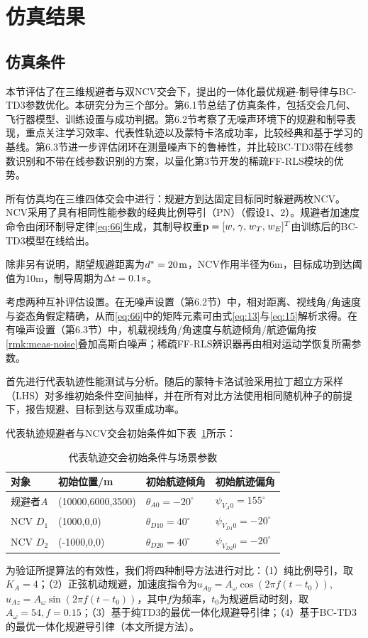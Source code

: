 \section{仿真结果}
\subsection{仿真条件}
本节评估了在三维规避者与双NCV交会下，提出的一体化最优规避-制导律与BC-TD3参数优化。本研究分为三个部分。第6.1节总结了仿真条件，包括交会几何、飞行器模型、训练设置与成功判据。第6.2节考察了无噪声环境下的规避和制导表现，重点关注学习效率、代表性轨迹以及蒙特卡洛成功率，比较经典和基于学习的基线。第6.3节进一步评估闭环在测量噪声下的鲁棒性，并比较BC-TD3带在线参数识别和不带在线参数识别的方案，以量化第3节开发的稀疏FF-RLS模块的优势。

所有仿真均在三维四体交会中进行：规避方到达固定目标同时躲避两枚NCV。NCV采用了具有相同性能参数的经典比例导引（PN）（假设1、2）。规避者加速度命令由闭环制导定律\eqref{eq:66}生成，其制导权重${\mathbf{p}} = {[w,{\kern 1pt} \gamma ,{\kern 1pt} {w_T},{\kern 1pt} {w_E}]^T}$由训练后的BC-TD3模型在线给出。

除非另有说明，期望规避距离为${d^*} = 20{\kern 1pt} {\text{m}}$，NCV作用半径为6m，目标成功到达阈值为10m，制导周期为$\Delta t = 0.1{\kern 1pt} {\text{s}}$。

考虑两种互补评估设置。在无噪声设置（第6.2节）中，相对距离、视线角/角速度与姿态角假定精确，从而\eqref{eq:66}中的矩阵元素可由式\eqref{eq:13}与\eqref{eq:15}解析求得。在有噪声设置（第6.3节）中，机载视线角/角速度与航迹倾角/航迹偏角按\cref{rmk:meas-noise}叠加高斯白噪声；稀疏FF-RLS辨识器再由相对运动学恢复所需参数。

首先进行代表轨迹性能测试与分析。随后的蒙特卡洛试验采用拉丁超立方采样（LHS）对多维初始条件空间抽样，并在所有对比方法使用相同随机种子的前提下，报告规避、目标到达与双重成功率。

代表轨迹规避者与NCV交会初始条件如下表~\ref{tab:init-traj}所示：

\begin{table}[htbp]
\centering
\caption{代表轨迹交会初始条件与场景参数}
\label{tab:init-traj}
\small
\begin{tabularx}{\linewidth}{lXXX}
\toprule
对象 & 初始位置/m & 初始航迹倾角 & 初始航迹偏角 \\
\midrule
规避者$A$ & (10000,6000,3500) & ${\theta _{A0}} =  - {20^ \circ }$ & ${\psi _{{V_A}0}} = {155^ \circ }$ \\
NCV ${D_1}$ & (1000,0,0) & ${\theta _{D10}} = {40^ \circ }$ & ${\psi _{{V_{D1}}0}} =  - {20^ \circ }$ \\
NCV ${D_2}$ & (-1000,0,0) & ${\theta _{D20}} = {40^ \circ }$ & ${\psi _{{V_{D2}}0}} =  - {20^ \circ }$ \\
\bottomrule
\end{tabularx}
\end{table}
为验证所提算法的有效性，我们将四种制导方法进行对比：（1）纯比例导引，取${K_A} = 4$；（2）正弦机动规避，加速度指令为${u_{Ay}} = {A_\omega }\cos (2\pi f(t - {t_0}))$, ${u_{Az}} = {A_\omega }\sin (2\pi f(t - {t_0}))$，其中$f$为频率，${t_0}$为规避启动时刻，取${A_\omega } = 54,f = 0.15$；（3）基于纯TD3的最优一体化规避导引律；（4）基于BC-TD3的最优一体化规避导引律（本文所提方法）。

